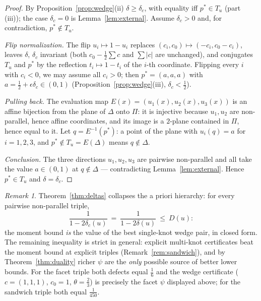 \documentclass{aims}
\numberwithin{equation}{section}
\theoremstyle{plain}
\theoremstyle{definition}
\theoremstyle{remark}
\newtheorem{remark}[theorem]{Remark}
\begin{document}
\begin{proof}
By Proposition~\ref{prop:wedge}(ii) $\delta\ge\delta_c$, with equality iff
$p^\ast\in T_u$ (part (iii)); the case $\delta_c=0$ is
Lemma~\ref{lem:external}. Assume $\delta_c>0$ and, for contradiction,
$p^\ast\notin T_u$.

\emph{Flip normalization.} The flip $u_i\mapsto1-u_i$ replaces
$(c_i,c_0)\mapsto(-c_i,c_0-c_i)$, leaves $\delta$, $\delta_c$ invariant
(both $c_0-\tfrac12\sum c$ and $\sum|c|$ are unchanged), and conjugates
$T_u$ and $p^\ast$ by the reflection $t_i\mapsto1-t_i$ of the $i$-th
coordinate. Flipping every $i$ with $c_i<0$, we may assume all $c_i>0$;
then $p^\ast=(a,a,a)$ with
$a=\tfrac12+\epsilon\delta_c\in(0,1)$ (Proposition~\ref{prop:wedge}(iii),
$\delta_c<\tfrac12$).

\emph{Pulling back.} The evaluation map $E(x)=(u_1(x),u_2(x),u_3(x))$ is an
affine bijection from the plane of $\Delta$ onto $\Pi$: it is injective
because $u_1,u_2$ are non-parallel, hence affine coordinates, and its image
is a $2$-plane contained in $\Pi$, hence equal to it. Let
$q=E^{-1}(p^\ast)$: a point of the plane with $u_i(q)=a$ for $i=1,2,3$, and
$p^\ast\notin T_u=E(\Delta)$ means $q\notin\Delta$.

\emph{Conclusion.} The three directions $u_1,u_2,u_3$ are pairwise
non-parallel and all take the value $a\in(0,1)$ at $q\notin\Delta$ ---
contradicting Lemma~\ref{lem:external}. Hence $p^\ast\in T_u$ and
$\delta=\delta_c$.
\end{proof}

\begin{remark}\label{rem:wedgemoment}
Theorem~\ref{thm:deltas} collapses the a priori hierarchy: for every
pairwise non-parallel triple,
\[
\frac1{1-2\delta_c(u)}\ =\ \frac1{1-2\delta(u)}\ \le\ D(u):
\]
the moment bound \emph{is} the value of the best single-knot wedge pair, in
closed form. The remaining inequality is strict in general: explicit
multi-knot certificates beat the moment bound at explicit triples
(Remark~\ref{rem:sandwich}), and by Theorem~\ref{thm:duality} richer $\psi$
are the \emph{only} possible source of better lower bounds. For the facet
triple both defects equal $\tfrac16$ and the wedge certificate ($c=(1,1,1)$,
$c_0=1$, $\theta=\tfrac23$) is precisely the facet $\psi$ displayed above;
for the sandwich triple both equal $\tfrac1{450}$.
\end{remark}
\end{document}
